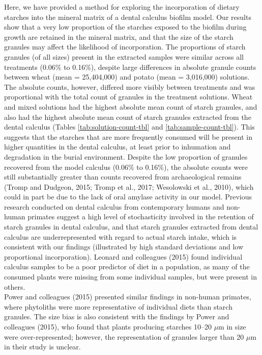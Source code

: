 \documentclass[utf8]{../templates/frontiersSCNS}
\begin{document}
Here, we have provided a method for exploring the incorporation of dietary
starches into the mineral matrix of a dental calculus biofilm model. Our results show
that a very low proportion of the starches exposed to the biofilm during growth are
retained in the mineral matrix, and that the size of the starch granules
may affect the likelihood of incorporation. The proportions of starch granules
(of all sizes) present in the extracted samples were similar across all treatments
(0.06\% to 0.16\%),
despite large differences in absolute granule counts between wheat
(mean = 25,404,000)
and potato
(mean = 3,016,000)
solutions.\\
The absolute counts, however, differed more visibly between treatments and was
proportional with the total count of granules in the treatment solutions. Wheat
and mixed solutions had the highest absolute mean count of starch granules, and
also had the highest absolute mean count of starch granules extracted from the
dental calculus
(Tables \ref{tab:solution-count-tbl} and \ref{tab:sample-count-tbl}).
This suggests that the starches that are more frequently consumed will be present
in higher quantities in the dental calculus, at least prior to inhumation and
degradation in the burial environment.
Despite the low proportion of granules recovered from the model calculus
(0.06\% to 0.16\%),
the absolute counts were still substantially greater than counts recovered from
archaeological remains
(Tromp and Dudgeon, 2015; Tromp et al., 2017; Wesolowski et al., 2010), which could in part be due to the
lack of oral amylase activity in our model.
Previous research conducted on dental calculus from contemporary humans and non-human
primates suggest a high level of stochasticity involved in the retention of
starch granules in dental calculus, and that starch granules extracted from dental
calculus are underrepresented with regard
to actual starch intake, which is consistent with our findings (illustrated by high
standard deviations and low proportional incorporation).
Leonard and colleagues (2015) found individual
calculus samples to be a poor predictor of diet in a population, as many of the
consumed plants were missing from some individual samples, but were present in others.\\
Power and colleagues (2015)
presented similar findings in non-human primates, where phytoliths were more
representative of individual diets than starch granules.
The size bias is also consistent with the findings by Power and colleagues
(2015),
who found that plants producing starches 10--20 \(\mu\)m in
size were over-represented; however, the representation of granules larger than
20 \(\mu\)m in their study is unclear.
\end{document}
